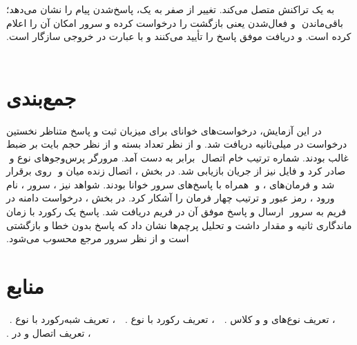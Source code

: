 ‫به یک تراکنش متصل می‌کند. تغییر  از صفر به یک، پاسخ‌شدن پیام را نشان می‌دهد؛ باقی‌ماندن
‫ و فعال‌شدن  یعنی  بازگشت را درخواست کرده و سرور امکان آن را اعلام کرده
‫است.  و  دریافت موفق پاسخ را تأیید می‌کنند و  با
‫عبارت  در خروجی  سازگار است.
‫
‫\section{جمع‌بندی}
‫
‫در این آزمایش، درخواست‌های خوانای  برای میزبان  ثبت و
‫پاسخ متناظر نخستین درخواست در  میلی‌ثانیه دریافت شد.  و  از
‫نظر تعداد بسته و  از نظر حجم بایت بر ضبط غالب بودند. شماره ترتیب خام اتصال
‫ برابر  به دست آمد. مرورگر پرس‌وجوهای  نوع  و
‫ صادر کرد و فایل  نیز از جریان  بازیابی شد.
‫در بخش ، اتصال زنده  میان  و
‫ روی  برقرار شد و فرمان‌های ،  و
‫ همراه با پاسخ‌های سرور خوانا بودند. شواهد  نیز 
‫، سرور ، نام ورود ، رمز عبور  و ترتیب
‫چهار فرمان  را آشکار کرد.
‫در بخش ، درخواست  دامنه  در فریم  به سرور
‫ ارسال و پاسخ موفق آن در فریم  دریافت شد. پاسخ یک
‫رکورد  با زمان ماندگاری  ثانیه و مقدار  داشت و تحلیل پرچم‌ها
‫نشان داد که پاسخ بدون خطا و بازگشتی است و از نظر سرور مرجع  محسوب می‌شود.
‫
‫\section{منابع}
‫
‫
‫
‫
‫
‫\href{https://www.rfc-editor.org/rfc/rfc1035.html}{}، تعریف نوع‌های  و  و کلاس .
‫
‫
‫\href{https://www.rfc-editor.org/rfc/rfc9460.html}{}، تعریف رکورد  با نوع .
‫
‫
‫\href{https://www.rfc-editor.org/rfc/rfc6891.html}{}، تعریف شبه‌رکورد  با نوع .
‫
‫
‫\href{https://www.rfc-editor.org/rfc/rfc854.html}{}، تعریف اتصال و  در .
‫
‫

